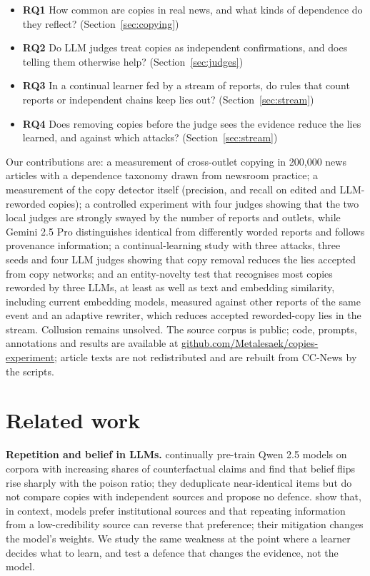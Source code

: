 \begin{itemize}
\tightlist
\item
  \textbf{RQ1} How common are copies in real news, and what kinds of dependence do they reflect? (Section~\ref{sec:copying})
\item
  \textbf{RQ2} Do LLM judges treat copies as independent confirmations, and does telling them otherwise help? (Section~\ref{sec:judges})
\item
  \textbf{RQ3} In a continual learner fed by a stream of reports, do rules that count reports or independent chains keep lies out? (Section~\ref{sec:stream})
\item
  \textbf{RQ4} Does removing copies before the judge sees the evidence reduce the lies learned, and against which attacks? (Section~\ref{sec:stream})
\end{itemize}

Our contributions are: a measurement of cross-outlet copying in 200,000 news articles with a dependence taxonomy drawn from newsroom practice; a measurement of the copy detector itself (precision, and recall on edited and LLM-reworded copies); a controlled experiment with four judges showing that the two local judges are strongly swayed by the number of reports and outlets, while Gemini 2.5 Pro distinguishes identical from differently worded reports and follows provenance information; a continual-learning study with three attacks, three seeds and four LLM judges showing that copy removal reduces the lies accepted from copy networks; and an entity-novelty test that recognises most copies reworded by three LLMs, at least as well as text and embedding similarity, including current embedding models, measured against other reports of the same event and an adaptive rewriter, which reduces accepted reworded-copy lies in the stream. Collusion remains unsolved. The source corpus is public; code, prompts, annotations and results are available at \href{https://github.com/Metalesaek/copies-experiment}{github.com/Metalesaek/copies-experiment}; article texts are not redistributed and are rebuilt from CC-News by the scripts.

\section{Related work}\label{sec:related}

\textbf{Repetition and belief in LLMs.} \citet{churina2025layer} continually pre-train Qwen 2.5 models on corpora with increasing shares of counterfactual claims and find that belief flips rise sharply with the poison ratio; they deduplicate near-identical items but do not compare copies with independent sources and propose no defence. \citet{schuster2026whose} show that, in context, models prefer institutional sources and that repeating information from a low-credibility source can reverse that preference; their mitigation changes the model's weights. We study the same weakness at the point where a learner decides what to learn, and test a defence that changes the evidence, not the model.

